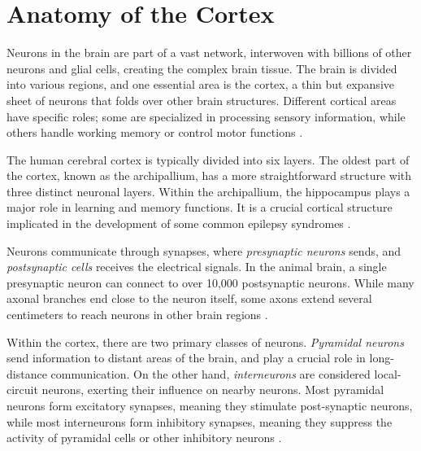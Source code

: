 \documentclass[a4paper, UKenglish, 11pt]{uiomaster}
\begin{document}
\section{Anatomy of the Cortex}
Neurons in the brain are part of a vast network, interwoven with billions of other neurons and glial cells, creating the complex brain tissue. The brain is divided into various regions, and one essential area is the cortex, a thin but expansive sheet of neurons that folds over other brain structures. Different cortical areas have specific roles; some are specialized in processing sensory information, while others handle working memory or control motor functions \cite{gerstner2014neuronal}.

The human cerebral cortex is typically divided into six layers. The oldest part of the cortex, known as the archipallium, has a more straightforward structure with three distinct neuronal layers. Within the archipallium, the hippocampus plays a major role in learning and memory functions. It is a crucial cortical structure implicated in the development of some common epilepsy syndromes \cite{bromfield2006introduction}.

Neurons communicate through synapses, where \emph{presynaptic neurons} sends, and \emph{postsynaptic cells} receives the electrical signals. In the animal brain, a single presynaptic neuron can connect to over 10,000 postsynaptic neurons. While many axonal branches end close to the neuron itself, some axons extend several centimeters to reach neurons in other brain regions \cite{gerstner2014neuronal}.

Within the cortex, there are two primary classes of neurons. \emph{Pyramidal neurons} send information to distant areas of the brain, and play a crucial role in long-distance communication. On the other hand, \emph{interneurons} are considered local-circuit neurons, exerting their influence on nearby neurons. Most pyramidal neurons form excitatory synapses, meaning they stimulate post-synaptic neurons, while most interneurons form inhibitory synapses, meaning they suppress the activity of pyramidal cells or other inhibitory neurons \cite{bromfield2006introduction}.
\end{document}
